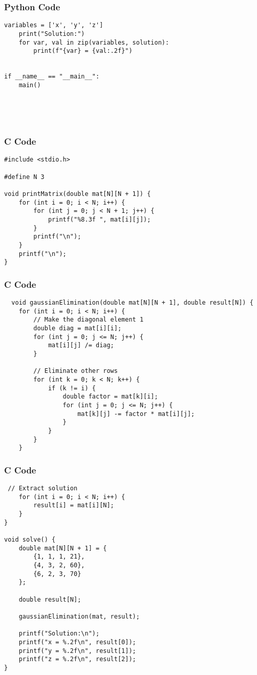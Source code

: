 \documentclass{beamer}
\begin{document}
\begin{frame}[fragile]
    \frametitle{Python Code}

    \begin{lstlisting}
variables = ['x', 'y', 'z']
    print("Solution:")
    for var, val in zip(variables, solution):
        print(f"{var} = {val:.2f}")


if __name__ == "__main__":
    main()





  \end{lstlisting}
\end{frame}

\begin{frame}[fragile]
\frametitle{C Code}
\begin{lstlisting}
#include <stdio.h>

#define N 3

void printMatrix(double mat[N][N + 1]) {
    for (int i = 0; i < N; i++) {
        for (int j = 0; j < N + 1; j++) {
            printf("%8.3f ", mat[i][j]);
        }
        printf("\n");
    }
    printf("\n");
}

    \end{lstlisting}

\end{frame}

\begin{frame}[fragile]
\frametitle{C Code}
\begin{lstlisting}
  void gaussianElimination(double mat[N][N + 1], double result[N]) {
    for (int i = 0; i < N; i++) {
        // Make the diagonal element 1
        double diag = mat[i][i];
        for (int j = 0; j <= N; j++) {
            mat[i][j] /= diag;
        }

        // Eliminate other rows
        for (int k = 0; k < N; k++) {
            if (k != i) {
                double factor = mat[k][i];
                for (int j = 0; j <= N; j++) {
                    mat[k][j] -= factor * mat[i][j];
                }
            }
        }
    }
\end{lstlisting}
\end{frame}
\begin{frame}[fragile]
\frametitle{C Code}
\begin{lstlisting}
 // Extract solution
    for (int i = 0; i < N; i++) {
        result[i] = mat[i][N];
    }
}

void solve() {
    double mat[N][N + 1] = {
        {1, 1, 1, 21},
        {4, 3, 2, 60},
        {6, 2, 3, 70}
    };

    double result[N];

    gaussianElimination(mat, result);

    printf("Solution:\n");
    printf("x = %.2f\n", result[0]);
    printf("y = %.2f\n", result[1]);
    printf("z = %.2f\n", result[2]);
}

\end{lstlisting}
\end{frame}
\end{document}
